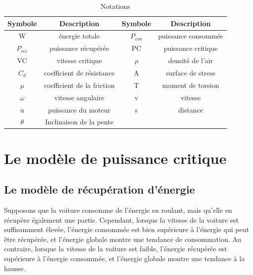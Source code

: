 \documentclass[lettersize,journal]{IEEEtran}
\begin{document}
\begin{table}[H]
    \centering
    \begin{tabular}{c|c|c|c}
    \hline
       Symbole  & Description &  Symbole  & Description  \\
        \hline
        W & énergie totale & $P_{con}$  & puissance consommée  \\
         
        $P_{rec}$ & puissance récupérée & PC &  puissance critique\\

         VC& vitesse critique & $\rho$  & densité de l'air\\

         $C_d$& coefficient de résistance  & A &  surface de stress \\

         $\mu$& coefficient de la friction & T & moment de torsion \\

         $\omega$& vitesse angulaire & v & vitesse  \\

         u & puissance du moteur & s & distance  \\
       
         $\theta$ &Inclinaison de la pente &  & \\
         \hline
    \end{tabular}
\caption{Notations}
\label{tab:my_label}
\end{table}

\section{Le modèle de puissance critique}

\subsection{Le modèle de récupération d'énergie}
Supposons que la voiture consomme de l’énergie en roulant, mais qu’elle en récupère également une partie. Cependant, lorsque la vitesse de la voiture est suffisamment élevée, l’énergie consommée est bien supérieure à l’énergie qui peut être récupérée, et l’énergie globale montre une tendance de consommation. Au contraire, lorsque la vitesse de la voiture est faible, l’énergie récupérée est supérieure à l’énergie consommée, et l’énergie globale montre une tendance à la hausse.\par
\end{document}
